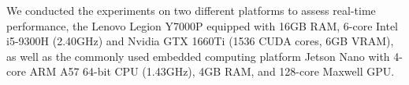 We conducted the experiments on two different platforms to assess real-time performance, the Lenovo Legion Y7000P equipped with 16GB RAM, 6-core Intel i5-9300H (2.40GHz) and Nvidia GTX 1660Ti (1536 CUDA cores, 6GB VRAM), as well as the commonly used embedded computing platform Jetson Nano with 4-core ARM A57 64-bit CPU (1.43GHz), 4GB RAM, and 128-core Maxwell GPU. 


